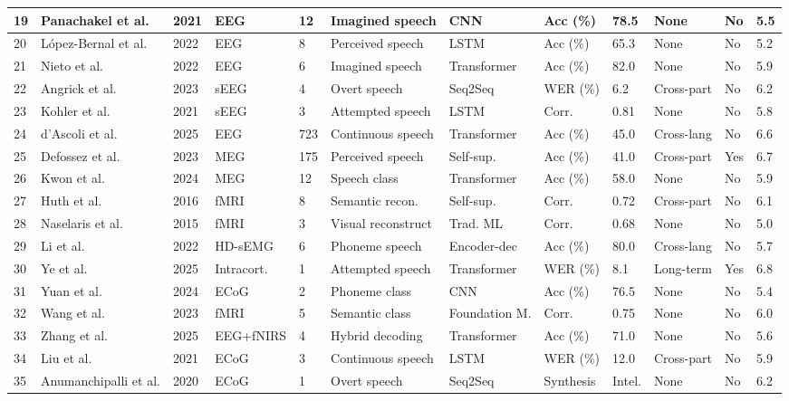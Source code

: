 \documentclass[11pt,a4paper]{article}
\begin{document}
{\begin{longtable}{|p{0.6cm}|p{1.8cm}|p{0.5cm}|p{1.2cm}|p{0.6cm}|p{1.0cm}|p{1.0cm}|p{0.8cm}|p{1.0cm}|p{1.0cm}|p{0.6cm}|p{0.6cm}|}
\hline
19 & Panachakel et al. & 2021 & EEG & 12 & Imagined speech & CNN & Acc (\%) & 78.5 & None & No & 5.5 \\
\hline
20 & López-Bernal et al. & 2022 & EEG & 8 & Perceived speech & LSTM & Acc (\%) & 65.3 & None & No & 5.2 \\
\hline
21 & Nieto et al. & 2022 & EEG & 6 & Imagined speech & Transformer & Acc (\%) & 82.0 & None & No & 5.9 \\
\hline
22 & Angrick et al. & 2023 & sEEG & 4 & Overt speech & Seq2Seq & WER (\%) & 6.2 & Cross-part & No & 6.2 \\
\hline
23 & Kohler et al. & 2021 & sEEG & 3 & Attempted speech & LSTM & Corr. & 0.81 & None & No & 5.8 \\
\hline
24 & d'Ascoli et al. & 2025 & EEG & 723 & Continuous speech & Transformer & Acc (\%) & 45.0 & Cross-lang & No & 6.6 \\
\hline
25 & Defossez et al. & 2023 & MEG & 175 & Perceived speech & Self-sup. & Acc (\%) & 41.0 & Cross-part & Yes & 6.7 \\
\hline
26 & Kwon et al. & 2024 & MEG & 12 & Speech class & Transformer & Acc (\%) & 58.0 & None & No & 5.9 \\
\hline
27 & Huth et al. & 2016 & fMRI & 8 & Semantic recon. & Self-sup. & Corr. & 0.72 & Cross-part & No & 6.1 \\
\hline
28 & Naselaris et al. & 2015 & fMRI & 3 & Visual reconstruct & Trad. ML & Corr. & 0.68 & None & No & 5.0 \\
\hline
29 & Li et al. & 2022 & HD-sEMG & 6 & Phoneme speech & Encoder-dec & Acc (\%) & 80.0 & Cross-lang & No & 5.7 \\
\hline
30 & Ye et al. & 2025 & Intracort. & 1 & Attempted speech & Transformer & WER (\%) & 8.1 & Long-term & Yes & 6.8 \\
\hline
31 & Yuan et al. & 2024 & ECoG & 2 & Phoneme class & CNN & Acc (\%) & 76.5 & None & No & 5.4 \\
\hline
32 & Wang et al. & 2023 & fMRI & 5 & Semantic class & Foundation M. & Corr. & 0.75 & None & No & 6.0 \\
\hline
33 & Zhang et al. & 2025 & EEG+fNIRS & 4 & Hybrid decoding & Transformer & Acc (\%) & 71.0 & None & No & 5.6 \\
\hline
34 & Liu et al. & 2021 & ECoG & 3 & Continuous speech & LSTM & WER (\%) & 12.0 & Cross-part & No & 5.9 \\
\hline
35 & Anumanchipalli et al. & 2020 & ECoG & 1 & Overt speech & Seq2Seq & Synthesis & Intel. & None & No & 6.2 \\

\end{longtable}}
\end{document}
